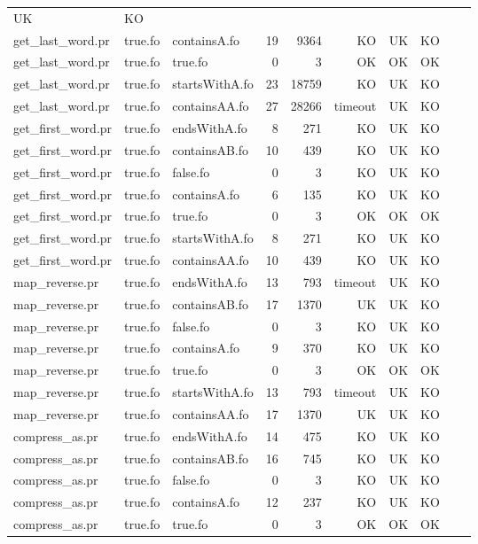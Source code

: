 \begin{tabular}{l|l|l|r|r|r|r|r|r|r}
UK & KO \\
get\_last\_word.pr & true.fo & containsA.fo & 19 & 9364 & KO & 
UK & KO \\
get\_last\_word.pr & true.fo & true.fo & 0 & 3 & OK & 
OK & OK \\
get\_last\_word.pr & true.fo & startsWithA.fo & 23 & 18759 & KO & 
UK & KO \\
get\_last\_word.pr & true.fo & containsAA.fo & 27 & 28266 & timeout & 
UK & KO \\
get\_first\_word.pr & true.fo & endsWithA.fo & 8 & 271 & KO & 
UK & KO \\
get\_first\_word.pr & true.fo & containsAB.fo & 10 & 439 & KO & 
UK & KO \\
get\_first\_word.pr & true.fo & false.fo & 0 & 3 & KO & 
UK & KO \\
get\_first\_word.pr & true.fo & containsA.fo & 6 & 135 & KO & 
UK & KO \\
get\_first\_word.pr & true.fo & true.fo & 0 & 3 & OK & 
OK & OK \\
get\_first\_word.pr & true.fo & startsWithA.fo & 8 & 271 & KO & 
UK & KO \\
get\_first\_word.pr & true.fo & containsAA.fo & 10 & 439 & KO & 
UK & KO \\
map\_reverse.pr & true.fo & endsWithA.fo & 13 & 793 & timeout & 
UK & KO \\
map\_reverse.pr & true.fo & containsAB.fo & 17 & 1370 & UK & 
UK & KO \\
map\_reverse.pr & true.fo & false.fo & 0 & 3 & KO & 
UK & KO \\
map\_reverse.pr & true.fo & containsA.fo & 9 & 370 & KO & 
UK & KO \\
map\_reverse.pr & true.fo & true.fo & 0 & 3 & OK & 
OK & OK \\
map\_reverse.pr & true.fo & startsWithA.fo & 13 & 793 & timeout & 
UK & KO \\
map\_reverse.pr & true.fo & containsAA.fo & 17 & 1370 & UK & 
UK & KO \\
compress\_as.pr & true.fo & endsWithA.fo & 14 & 475 & KO & 
UK & KO \\
compress\_as.pr & true.fo & containsAB.fo & 16 & 745 & KO & 
UK & KO \\
compress\_as.pr & true.fo & false.fo & 0 & 3 & KO & 
UK & KO \\
compress\_as.pr & true.fo & containsA.fo & 12 & 237 & KO & 
UK & KO \\
compress\_as.pr & true.fo & true.fo & 0 & 3 & OK & 
OK & OK \\

\end{tabular}
